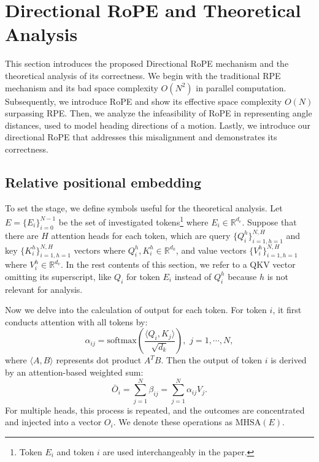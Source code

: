 \documentclass[lettersize,journal]{IEEEtran}
\theoremstyle{definition}
\begin{document}
\section{Directional RoPE and Theoretical Analysis}

This section introduces the proposed Directional RoPE mechanism and the theoretical analysis of its correctness.
We begin with the traditional RPE mechanism and its bad space complexity $O(N^2)$ in parallel computation.
Subsequently, we introduce RoPE and show its effective space complexity $O(N)$ surpassing RPE.
Then, we analyze the infeasibility of RoPE in representing angle distances, used to model heading directions of a motion.
Lastly, we introduce our directional RoPE that addresses this misalignment and demonstrates its correctness.

\subsection{Relative positional embedding}

To set the stage, we define symbols useful for the theoretical analysis.
Let \(E=\{E_i\}_{i=0}^{N-1}\) be the set of investigated tokens\footnote{Token $E_i$ and token $i$ are used interchangeably in the paper.} where $E_i\in \mathbb{R}^{d_e}$.
Suppose that there are \( H \) attention heads for each token, which are query $\{Q_{i}^h\}_{{i=1},{h=1}}^{N,H}$ and key $\{K_{i}^h\}_{{i=1},{h=1}}^{N,H}$ vectors where $Q_i^h,K_i^h\in \mathbb{R}^{d_k}$, and value vectors $\{V_{i}^h\}_{{i=1},{h=1}}^{N,H}$ where \(V_{i}^h\in \mathbb{R}^{d_v}\).
In the rest contents of this section, we refer to a QKV vector omitting its superscript, like $Q_i$ for token $E_i$ instead of $Q_i^h$ because $h$ is not relevant for analysis.

Now we delve into the calculation of output for each token. For token $i$, it first conducts attention with all tokens by:
\begin{equation}
\label{eq:attention_score_base}
\alpha_{ij} = \mathrm{softmax} \left( \frac{\langle Q_i, K_j \rangle}{\sqrt{d_k}} \right),\,\, j=1,\cdots,N,
\end{equation}
where $\langle A,B\rangle$ represents dot product $A^T B$.
Then the output of token $i$ is derived by an attention-based weighted sum:
\begin{equation}
\bar{O}_i = \sum_{j=1}^N \beta_{ij} = \sum_{j=1}^{N} \alpha_{ij} V_j.
\label{eq:mult_attention_outcome}
\end{equation}
For multiple heads, this process is repeated, and the outcomes are concentrated and injected into a vector $O_i$. We denote these operations as $\text{MHSA}(E)$.
\end{document}
